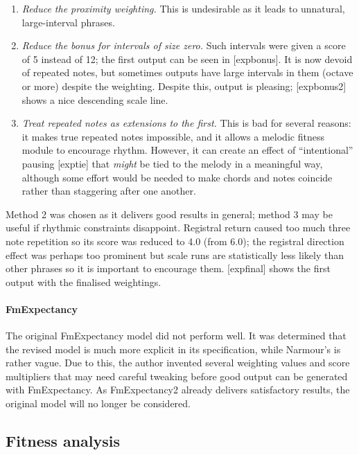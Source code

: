 \begin{enumerate}
\item \emph{Reduce the proximity weighting.} This is undesirable as it leads to unnatural, large-interval phrases.
\item \emph{Reduce the bonus for intervals of size zero.} Such intervals were given a score of 5 instead of 12; the first output can be seen in [expbonus]. It is now  devoid of repeated notes, but sometimes outputs have large intervals in them (octave or more) despite the weighting. Despite this, output is pleasing; [expbonus2] shows a nice descending scale line.
\item \emph{Treat repeated notes as extensions to the first.} This is bad for several reasons: it makes true repeated notes impossible, and it allows a melodic fitness module to encourage rhythm. However, it can create an effect of ``intentional'' pausing [exptie] that \emph{might} be tied to the melody in a meaningful way, although some effort would be needed to make chords and notes coincide rather than staggering after one another.
\end{enumerate}

Method 2 was chosen as it delivers good results in general; method 3 may be useful if rhythmic constraints disappoint. Registral return caused too much three note repetition so its score was reduced to 4.0 (from 6.0); the registral direction effect 
was perhaps too prominent but scale runs are statistically less likely than other phrases so it is important to encourage them. [expfinal] shows the first output with the finalised weightings.

\paragraph{FmExpectancy} The original FmExpectancy model did not perform well. It was determined that the revised model \citep{schellenberg96} is much more explicit in its specification, while Narmour's is rather vague. Due to this, the author invented several weighting values and score multipliers that may need careful tweaking before good output can be generated with FmExpectancy. As FmExpectancy2 already delivers satisfactory results, the original model will no longer be considered.

\subsection{Fitness analysis}

